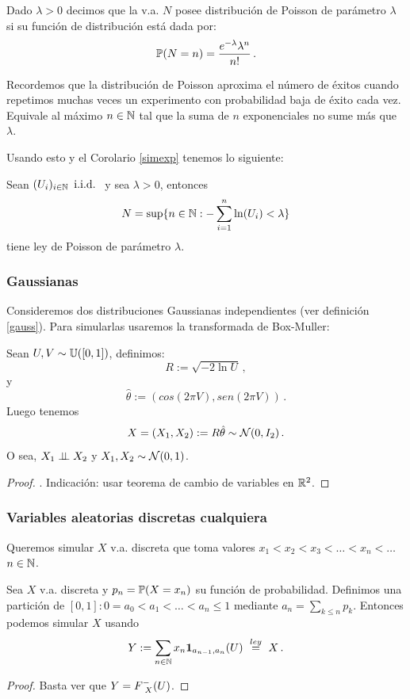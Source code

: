 \begin{definition}
Dado $\lambda>0$ decimos que la v.a. $N$ posee distribución de Poisson de parámetro $\lambda$ si su función de distribución está dada por:
$$ \P(N=n)=\displaystyle\frac{e^{-\lambda}\lambda^n}{n!} \, .$$
\end{definition}
\begin{remark}
Recordemos que la distribución de Poisson aproxima el número de éxitos cuando repetimos muchas veces un experimento con probabilidad baja de éxito cada vez. Equivale al máximo $n\in\N$ tal que la suma de $n$ exponenciales no sume más que $\lambda$.
\end{remark}
Usando esto y el Corolario \ref{simexp} tenemos lo siguiente:
\begin{corolary}
Sean $(U_i)_{i\in\N} \, \iid$ y sea $\lambda>0$, entonces
$$ N = \sup\{n\in\N : \displaystyle - \sum^n_{i=1}\ln(U_i)<\lambda\}$$
tiene ley de Poisson de parámetro $\lambda$.
\end{corolary}
\subsubsection{Gaussianas}
Consideremos dos distribuciones Gaussianas independientes (ver definición \ref{gauss}). Para simularlas usaremos la transformada de Box-Muller:

\begin{proposition} 
Sean $U,V\sim\unif$, definimos:
$$R:=\displaystyle\sqrt{-2 \ln U}\, ,$$ y $$ \hat{\theta}:=(cos(2\pi V),sen(2\pi V)) \, .$$
Luego tenemos
$$ X=(X_1,X_2):=R\hat{\theta}\sim\normal(0,I_2) \, .$$
O sea, $X_1\indep X_2$ y $X_1,X_2\sim\normal(0,1)$.
\end{proposition}
\begin{proof}
\ejercicio. \gris Indicación: usar teorema de cambio de variables en $\R^2$. \negro
\end{proof}

\subsubsection{Variables aleatorias discretas cualquiera}
\label{disc}
Queremos simular $X$ v.a. discreta que toma valores $x_1<x_2<x_3<\dots<x_n<\dots$ $n\in\N$.
\begin{proposition}
Sea $X$ v.a. discreta y $p_n=\P(X=x_n)$ su función de probabilidad. Definimos una partición de $[0,1]:0=a_0<a_1<\dots<a_n\leq1$ mediante $a_n=\sum_{k\leq n}p_k$. Entonces podemos simular $X$ usando
$$ Y:=\displaystyle\sum_{n\in\N}x_n \mathbf{1}_{a_{n-1},a_n}(U)\igualley X \, .$$
\end{proposition}
\begin{proof}
Basta ver que $Y=\Finvgen(U)$. \ejercicio
\end{proof}

